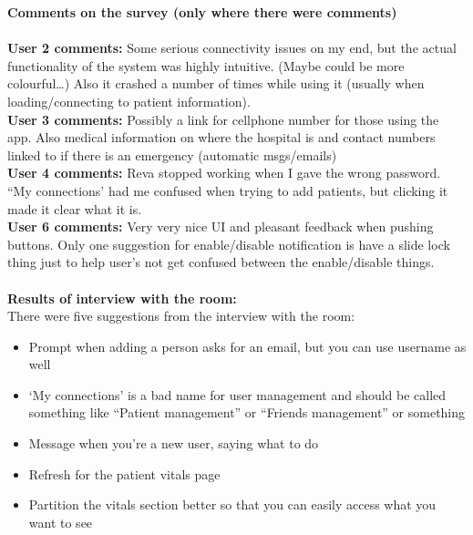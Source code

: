 \documentclass[12pt]{article}
\begin{document}
{\textbf{Comments on the survey (only where there were comments)}\\
\\
\textbf{User 2 comments:}  Some serious connectivity issues on my end, but the actual functionality of the system was highly intuitive. (Maybe could be more colourful…) Also it crashed a number of times while using it (usually when loading/connecting to patient information). \\
\textbf{User 3 comments:}  Possibly a link for cellphone number for those using the app. Also medical information on where the hospital is and contact numbers linked to if there is an emergency (automatic msgs/emails) \\
\textbf{User 4 comments:} Reva stopped working when I gave the wrong password. “My connections’ had me confused when trying to add patients, but clicking it made it clear what it is. \\
\textbf{User 6 comments:} Very very nice UI and pleasant feedback when pushing buttons. Only one suggestion for enable/disable notification is have a slide lock thing just to help user’s not get confused between the enable/disable things.  \\ \\

\textbf{Results of interview with the room: } \\
There were five suggestions from the interview with the room: 
\begin{itemize}
	\item Prompt when adding a person asks for an email, but you can use username as well
	\item ‘My connections’ is a bad name for user management and should be called something like “Patient management” or “Friends management” or something
	\item Message when you’re a new user, saying what to do
	\item Refresh for the patient vitals page
	\item Partition the vitals section better so that you can easily access what you want to see
\end{itemize}	

}
\end{document}
